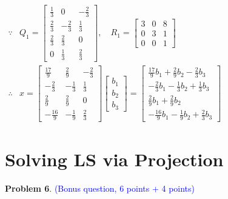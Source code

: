 \documentclass[english,onecolumn]{IEEEtran}
\begin{document}
\begin{enumerate}
$\begin{aligned} \because & Q_{1}=\left[\begin{array}{rrr}\frac{1}{3} & 0 & -\frac{2}{3} \\ \frac{2}{3} & -\frac{2}{3} & \frac{1}{3} \\ \frac{2}{3} & \frac{2}{3} & 0 \\ 0 & \frac{1}{3} & \frac{2}{3}\end{array}\right], \quad R_{1}=\left[\begin{array}{ccc}3 & 0 & 8 \\ 0 & 3 & 1 \\ 0 & 0 & 1\end{array}\right] \\ \therefore & x=\left[\begin{array}{ccc}\frac{17}{9} & \frac{2}{9} & -\frac{2}{3} \\ -\frac{2}{3} & -\frac{1}{3} & \frac{1}{3} \\ \frac{2}{9} & \frac{2}{9} & 0 \\ -\frac{16}{9} & -\frac{1}{9} & \frac{2}{3}\end{array}\right]\left[\begin{array}{c}b_{1} \\ b_{2} \\ b_{3}\end{array}\right] =\left[\begin{array}{l}
\frac{17}{9} b_{1}+\frac{2}{9} b_{2}-\frac{2}{3} b_{3} \\
-\frac{2}{3} b_{1}-\frac{1}{3} b_{2}+\frac{1}{3} b_{3} \\
\frac{2}{9} b_{1}+\frac{2}{9} b_{2} \\
-\frac{16}{9} b_{1}-\frac{1}{9} b_{2}+\frac{2}{3} b_{3}
\end{array}\right] \end{aligned}$





\end{enumerate}

\newpage
\section{Solving LS via Projection}
\noindent\textbf{Problem 6}. \textcolor{blue}{(Bonus question, 6 points + 4 points)}
\end{document}

